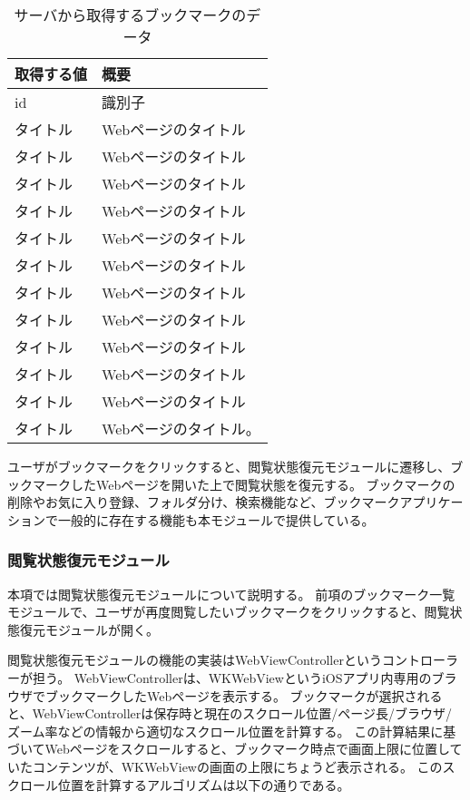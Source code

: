 \begin{table}[htbp]
  \label{tb:ios-bookmark-response}
  \caption{サーバから取得するブックマークのデータ}
  \begin{center}
    \begin{tabular}{|l|l|}
    \hline
    取得する値 & 概要 \\ \hline
    id & 識別子 \\ \hline
    タイトル & Webページのタイトル \\ \hline
    タイトル & Webページのタイトル \\ \hline
    タイトル & Webページのタイトル \\ \hline
    タイトル & Webページのタイトル \\ \hline
    タイトル & Webページのタイトル \\ \hline
    タイトル & Webページのタイトル \\ \hline
    タイトル & Webページのタイトル \\ \hline
    タイトル & Webページのタイトル \\ \hline
    タイトル & Webページのタイトル \\ \hline
    タイトル & Webページのタイトル \\ \hline
    タイトル & Webページのタイトル \\ \hline
    タイトル & Webページのタイトル。 \\ \hline
    \end{tabular}
  \end{center}
\end{table}

ユーザがブックマークをクリックすると、閲覧状態復元モジュールに遷移し、ブックマークしたWebページを開いた上で閲覧状態を復元する。
ブックマークの削除やお気に入り登録、フォルダ分け、検索機能など、ブックマークアプリケーションで一般的に存在する機能も本モジュールで提供している。

\subsubsection{閲覧状態復元モジュール}
本項では閲覧状態復元モジュールについて説明する。
前項のブックマーク一覧モジュールで、ユーザが再度閲覧したいブックマークをクリックすると、閲覧状態復元モジュールが開く。

閲覧状態復元モジュールの機能の実装はWebViewControllerというコントローラーが担う。
WebViewControllerは、WKWebViewというiOSアプリ内専用のブラウザでブックマークしたWebページを表示する。
ブックマークが選択されると、WebViewControllerは保存時と現在のスクロール位置/ページ長/ブラウザ/ズーム率などの情報から適切なスクロール位置を計算する。
この計算結果に基づいてWebページをスクロールすると、ブックマーク時点で画面上限に位置していたコンテンツが、WKWebViewの画面の上限にちょうど表示される。
このスクロール位置を計算するアルゴリズムは以下の通りである。


